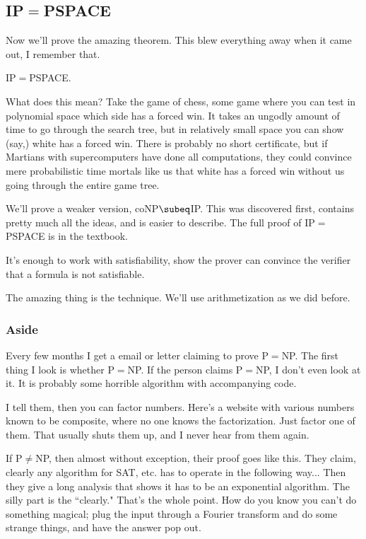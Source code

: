 \subsection{IP$=$PSPACE}
Now we'll prove the amazing theorem. This blew everything away when it came out, I remember that.
\begin{thm}
IP$=$PSPACE.
\end{thm}
What does this mean? Take the game of chess, some game where you can test in polynomial space which side has a forced win. It takes an ungodly amount of time to go through the search tree, but in relatively small space you can show (say,) white has a forced win. There is probably no short certificate, but if Martians with supercomputers have done all computations, they could convince mere probabilistic time mortals like us that white has a forced win without us going through the entire game tree.

We'll prove a weaker version, coNP$\subeq$IP. This was discovered first, contains pretty much all the ideas, and is easier to describe. The full proof of IP$=$PSPACE is in the textbook.

It's enough to work with satisfiability, show the prover can convince the verifier that a formula is not satisfiable.

The amazing thing is the technique. We'll use arithmetization as we did before.

\subsubsection{Aside}
Every few months I get a email or letter claiming to prove P$=$NP. The first thing I look is whether P$=$NP. If the person claims P$=$NP, I don't even look at it. It is probably some horrible algorithm with accompanying code.

I tell them, then you can factor numbers. Here's a website with various numbers known to be composite, where no one knows the factorization. Just factor one of them. That usually shuts them up, and I never hear from them again.

If P$\ne$NP, then almost without exception, their proof goes like this. They claim, clearly any algorithm for SAT, etc. has to operate in the following way... Then they give a long analysis that shows it has to be an exponential algorithm. The silly part is the ``clearly." That's the whole point. How do you know you can't do something magical; plug the input through a Fourier transform and do some strange things, and have the answer pop out.

